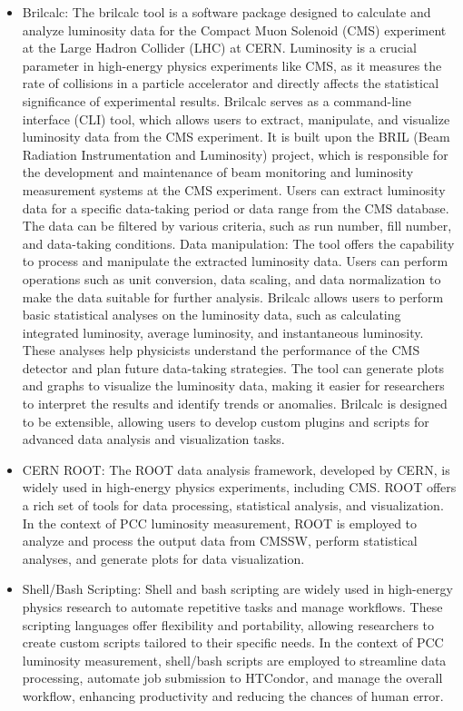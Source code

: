 \begin{itemize}
\item Brilcalc: The brilcalc tool is a software package designed to calculate and analyze luminosity data for the Compact Muon Solenoid (CMS) experiment at the Large Hadron Collider (LHC) at CERN. Luminosity is a crucial parameter in high-energy physics experiments like CMS, as it measures the rate of collisions in a particle accelerator and directly affects the statistical significance of experimental results. Brilcalc serves as a command-line interface (CLI) tool, which allows users to extract, manipulate, and visualize luminosity data from the CMS experiment. It is built upon the BRIL (Beam Radiation Instrumentation and Luminosity) project, which is responsible for the development and maintenance of beam monitoring and luminosity measurement systems at the CMS experiment. Users can extract luminosity data for a specific data-taking period or data range from the CMS database. The data can be filtered by various criteria, such as run number, fill number, and data-taking conditions. Data manipulation: The tool offers the capability to process and manipulate the extracted luminosity data. Users can perform operations such as unit conversion, data scaling, and data normalization to make the data suitable for further analysis. Brilcalc allows users to perform basic statistical analyses on the luminosity data, such as calculating integrated luminosity, average luminosity, and instantaneous luminosity. These analyses help physicists understand the performance of the CMS detector and plan future data-taking strategies. The tool can generate plots and graphs to visualize the luminosity data, making it easier for researchers to interpret the results and identify trends or anomalies. Brilcalc is designed to be extensible, allowing users to develop custom plugins and scripts for advanced data analysis and visualization tasks.

\item CERN ROOT: The ROOT data analysis framework, developed by CERN, is widely used in high-energy physics experiments, including CMS. ROOT offers a rich set of tools for data processing, statistical analysis, and visualization. In the context of PCC luminosity measurement, ROOT is employed to analyze and process the output data from CMSSW, perform statistical analyses, and generate plots for data visualization.

\item Shell/Bash Scripting: Shell and bash scripting are widely used in high-energy physics research to automate repetitive tasks and manage workflows. These scripting languages offer flexibility and portability, allowing researchers to create custom scripts tailored to their specific needs. In the context of PCC luminosity measurement, shell/bash scripts are employed to streamline data processing, automate job submission to HTCondor, and manage the overall workflow, enhancing productivity and reducing the chances of human error.


\end{itemize}
